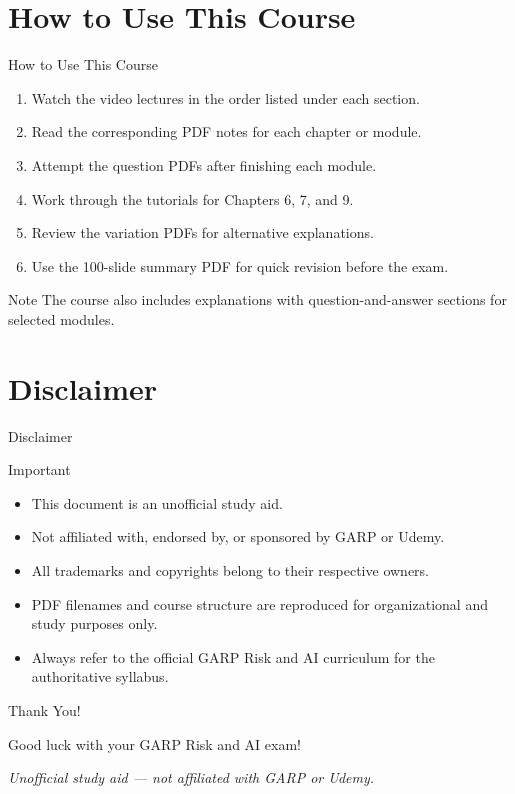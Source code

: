 \documentclass[aspectratio=169,11pt]{beamer}
\begin{document}
	\section{How to Use This Course}
	
	\begin{frame}{How to Use This Course}
		\begin{enumerate}
			\item Watch the video lectures in the order listed under each section.
			\item Read the corresponding PDF notes for each chapter or module.
			\item Attempt the question PDFs after finishing each module.
			\item Work through the tutorials for Chapters 6, 7, and 9.
			\item Review the variation PDFs for alternative explanations.
			\item Use the 100-slide summary PDF for quick revision before the exam.
		\end{enumerate}
		\begin{block}{Note}
			The course also includes explanations with question-and-answer sections for selected modules.
		\end{block}
	\end{frame}
	
	\section{Disclaimer}
	
	\begin{frame}{Disclaimer}
		\begin{block}{Important}
			\begin{itemize}
				\item This document is an unofficial study aid.
				\item Not affiliated with, endorsed by, or sponsored by GARP or Udemy.
				\item All trademarks and copyrights belong to their respective owners.
				\item PDF filenames and course structure are reproduced for organizational and study purposes only.
				\item Always refer to the official GARP Risk and AI curriculum for the authoritative syllabus.
			\end{itemize}
		\end{block}
	\end{frame}
	
	\begin{frame}
		\centering
		\Huge \textcolor{garpblue}{Thank You!}
		\vspace{1cm}
		
		\Large Good luck with your GARP Risk and AI exam!
		\vspace{1cm}
		
		\normalsize
		\textit{Unofficial study aid --- not affiliated with GARP or Udemy.}
	\end{frame}
	
\end{document}
